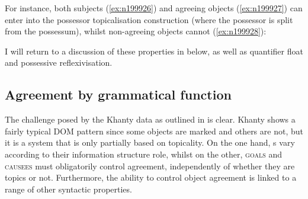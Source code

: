 \documentclass[output=paper
,modfonts
,nonflat]{langsci/langscibook}
\begin{document}
For instance, both subjects (\ref{ex:n199926}) and agreeing objects (\ref{ex:n199927}) can enter into the possessor topicalisation construction (where the possessor is split from the possessum), whilst non-agreeing objects cannot (\ref{ex:n199928}):

\begin{exe}
\ex \citet[][346]{nikolaeva1999} \label{ex:n1999possess}
\begin{xlist}
 \label{ex:n199926}

\label{ex:n199927}

 \label{ex:n199928}
\end{xlist}
\end{exe}

\noindent I will return to a discussion of these properties in  below, as well as quantifier float and possessive reflexivisation.



\subsection{Agreement by grammatical function}
\label{sec:agreementbygf}

The challenge posed by the Khanty data as outlined in  is clear. Khanty shows a fairly typical DOM pattern since some objects are marked and others are not, but it is a system that is only partially based on topicality.
 On the one hand, \theme s vary according to their information structure role, whilst on the other, \textsc{goals} and \textsc{causees} must obligatorily control agreement, independently of whether they are topics or not.
Furthermore, the ability to control object agreement is linked to a range of other syntactic properties.
\end{document}
